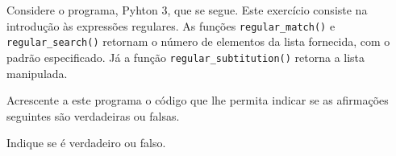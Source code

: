 \documentclass[12pt,varwidth=16cm,border=1pt]{standalone}
\begin{document}
Considere o programa, Pyhton 3, que se segue. Este exercício consiste na introdução às expressões regulares. As funções \verb+regular_match()+ e \verb+regular_search()+ retornam o número de elementos da lista fornecida, com o padrão especificado. Já a função \verb+regular_subtitution()+ retorna a lista manipulada.



Acrescente a este programa o código que lhe permita indicar se as
afirmações seguintes são verdadeiras ou falsas.

Indique se é verdadeiro ou falso.
\end{document}
